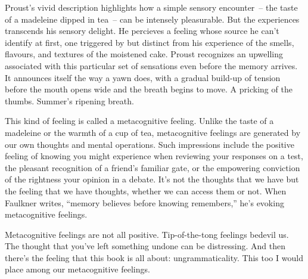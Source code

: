 Proust's vivid description highlights how a simple sensory encounter~-- the taste of a madeleine dipped in tea~-- can be intensely pleasurable. But the experiences transcends his sensory delight. He percieves a feeling whose source he can't identify at first, one triggered by but distinct from his experience of the smells, flavours, and textures of the moistened cake. Proust recognizes an upwelling associated with this particular set of sensations even before the memory arrives. It announces itself the way a yawn does, with a gradual build-up of tension before the mouth opens wide and the breath begins to move. A pricking of the thumbs. Summer's ripening breath.

This kind of feeling is called a metacognitive feeling. Unlike the taste of a madeleine or the warmth of a cup of tea, metacognitive feelings are generated by our own thoughts and mental operations. Such impressions include the positive feeling of knowing you might experience when reviewing your responses on a test, the pleasant recognition of a friend's familiar gate, or the empowering conviction of the rightness your opinion in a debate. It's not the thoughts that we have but the feeling that we have thoughts, whether we can access them or not. When Faulkner writes, ``memory believes before knowing remembers,'' he's evoking metacognitive feelings.

Metacognitive feelings are not all positive. Tip-of-the-tong feelings bedevil us. The thought that you've left something undone can be distressing. And then there's the feeling that this book is all about: ungrammaticality. This too I would place among our metacognitive feelings.




